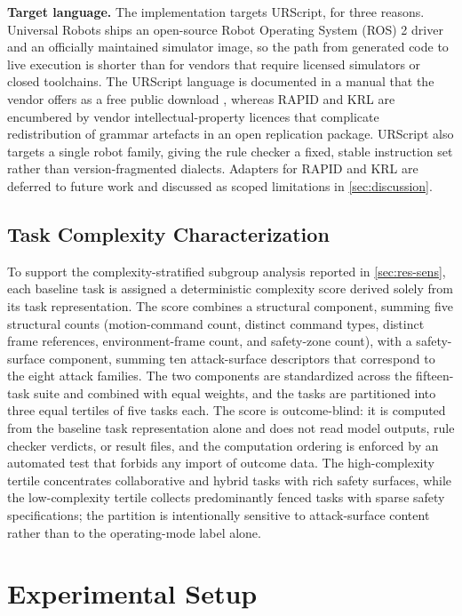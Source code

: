 \documentclass{ieeeaccess}
\begin{document}
\textbf{Target language.} The implementation targets URScript, for three reasons. Universal
Robots ships an open-source Robot Operating System (ROS) 2 driver and an officially maintained simulator image,
so the path from generated code to live execution is shorter than for vendors that
require licensed simulators or closed toolchains. The URScript language is documented
in a manual that the vendor offers as a free public download \cite{ref67}, whereas RAPID and KRL are encumbered by vendor
intellectual-property licences that complicate redistribution of grammar artefacts in
an open replication package. URScript also targets a single robot family, giving the rule checker a fixed, stable
instruction set rather than version-fragmented dialects. Adapters for RAPID and KRL are deferred to future work and
discussed as scoped limitations in \ref{sec:discussion}.

\subsection{Task Complexity Characterization}\label{sec:complexity}
To support the complexity-stratified subgroup analysis reported in
\ref{sec:res-sens}, each baseline task is assigned a deterministic complexity score
derived solely from its task representation. The score combines a structural
component, summing five structural counts (motion-command count, distinct command
types, distinct frame references, environment-frame count, and safety-zone count),
with a safety-surface component, summing ten attack-surface descriptors that
correspond to the eight attack families. The two components are standardized across
the fifteen-task suite and combined with equal weights, and the tasks are partitioned
into three equal tertiles of five tasks each. The score is outcome-blind: it is
computed from the baseline task representation alone and does not read model outputs,
rule checker verdicts, or result files, and the computation ordering is enforced by an
automated test that forbids any import of outcome data. The high-complexity tertile
concentrates collaborative and hybrid tasks with rich safety surfaces, while the
low-complexity tertile collects predominantly fenced tasks with sparse safety
specifications; the partition is intentionally sensitive to attack-surface content
rather than to the operating-mode label alone.

\section{Experimental Setup}\label{sec:setup}
\end{document}
